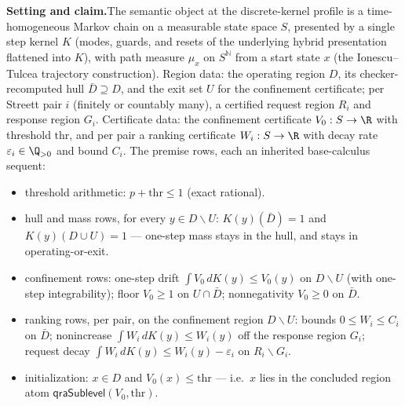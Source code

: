 

\textbf{Setting and claim.}\enspace The semantic object at the discrete-kernel
profile is a time-homogeneous Markov chain on a measurable state space $S$,
presented by a single step kernel $K$ (modes, guards, and resets of the
underlying hybrid presentation flattened into $K$), with path measure $\mu_x$
on $S^{\mathbb{N}}$ from a start state $x$ (the Ionescu--Tulcea trajectory
construction). Region data: the operating region $D$, its checker-recomputed
hull $\bar{D} \supseteq D$, and the exit set $U$ for the confinement
certificate; per Streett pair $i$ (finitely or countably many), a certified
request region $R_i$ and response region $G_i$. Certificate data: the
confinement certificate $V_0 : S \to \R$ with threshold
$\mathrm{thr}$, and per pair a ranking certificate $W_i : S \to \R$ with decay
rate $\varepsilon_i \in \Q_{>0}$ and bound $C_i$. The premise rows, each an
inherited base-calculus sequent:

\begin{itemize}
\item[(H1)] threshold arithmetic: $p + \mathrm{thr} \le 1$ (exact rational).
\item[(H2)] hull and mass rows, for every $y \in D \smallsetminus U$:
  $K(y)(\bar{D}) = 1$ and $K(y)(D \cup U) = 1$ --- one-step mass stays in the
  hull, and stays in operating-or-exit.
\item[(H3)] confinement rows: one-step drift
  $\int V_0 \, dK(y) \le V_0(y)$ on $D \smallsetminus U$ (with one-step
  integrability); floor $V_0 \ge 1$ on $U \cap \bar{D}$; nonnegativity
  $V_0 \ge 0$ on $\bar{D}$.
\item[(H4)] ranking rows, per pair, on the confinement region
  $D \smallsetminus U$: bounds $0 \le W_i \le C_i$ on $\bar{D}$; nonincrease
  $\int W_i \, dK(y) \le W_i(y)$ off the response region $G_i$; request decay
  $\int W_i \, dK(y) \le W_i(y) - \varepsilon_i$ on $R_i \smallsetminus G_i$.
\item[(H5)] initialization: $x \in D$ and $V_0(x) \le \mathrm{thr}$ --- i.e.\
  $x$ lies in the concluded region atom
  $\mathsf{qraSublevel}(V_0, \mathrm{thr})$.
\end{itemize}

